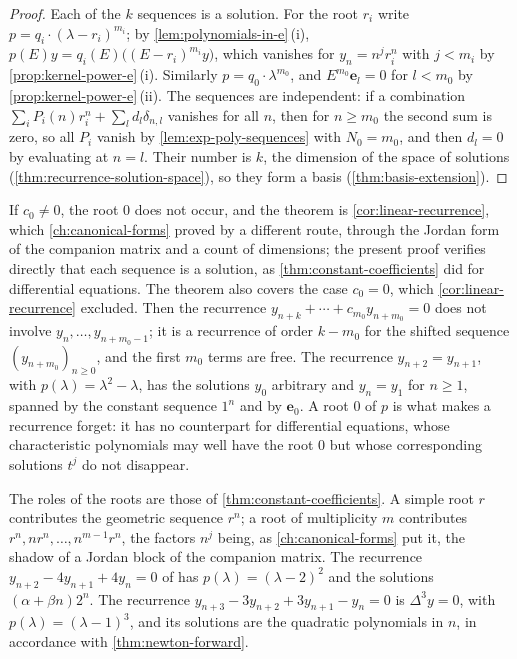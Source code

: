 \begin{proof}
Each of the $k$ sequences is a solution. For the root $r_i$ write $p=q_i\cdot(\lambda-r_i)^{m_i}$; by \cref{lem:polynomials-in-e}\,(i), $p(E)y=q_i(E)\bigl((E-r_i)^{m_i}y\bigr)$, which vanishes for $y_n=n^jr_i^n$ with $j<m_i$ by \cref{prop:kernel-power-e}\,(i). Similarly $p=q_0\cdot\lambda^{m_0}$, and $E^{m_0}\mathbf e_l=0$ for $l<m_0$ by \cref{prop:kernel-power-e}\,(ii). The sequences are independent: if a combination $\sum_iP_i(n)r_i^n+\sum_ld_l\delta_{n,l}$ vanishes for all $n$, then for $n\ge m_0$ the second sum is zero, so all $P_i$ vanish by \cref{lem:exp-poly-sequences} with $N_0=m_0$, and then $d_l=0$ by evaluating at $n=l$. Their number is $k$, the dimension of the space of solutions (\cref{thm:recurrence-solution-space}), so they form a basis (\cref{thm:basis-extension}).
\end{proof}

If $c_0\ne0$, the root $0$ does not occur, and the theorem is \cref{cor:linear-recurrence}, which \cref{ch:canonical-forms} proved by a different route, through the Jordan form of the companion matrix and a count of dimensions; the present proof verifies directly that each sequence is a solution, as \cref{thm:constant-coefficients} did for differential equations. The theorem also covers the case $c_0=0$, which \cref{cor:linear-recurrence} excluded. Then the recurrence $y_{n+k}+\cdots+c_{m_0}y_{n+m_0}=0$ does not involve $y_n,\ldots,y_{n+m_0-1}$; it is a recurrence of order $k-m_0$ for the shifted sequence $(y_{n+m_0})_{n\ge0}$, and the first $m_0$ terms are free. The recurrence $y_{n+2}=y_{n+1}$, with $p(\lambda)=\lambda^2-\lambda$, has the solutions $y_0$ arbitrary and $y_n=y_1$ for $n\ge1$, spanned by the constant sequence $1^n$ and by $\mathbf e_0$. A root $0$ of $p$ is what makes a recurrence forget: it has no counterpart for differential equations, whose characteristic polynomials may well have the root $0$ but whose corresponding solutions $t^j$ do not disappear.

The roles of the roots are those of \cref{thm:constant-coefficients}. A simple root $r$ contributes the geometric sequence $r^n$; a root of multiplicity $m$ contributes $r^n,nr^n,\ldots,n^{m-1}r^n$, the factors $n^j$ being, as \cref{ch:canonical-forms} put it, the shadow of a Jordan block of the companion matrix. The recurrence $y_{n+2}-4y_{n+1}+4y_n=0$ of  has $p(\lambda)=(\lambda-2)^2$ and the solutions $(\alpha+\beta n)2^n$. The recurrence $y_{n+3}-3y_{n+2}+3y_{n+1}-y_n=0$ is $\Delta^3y=0$, with $p(\lambda)=(\lambda-1)^3$, and its solutions are the quadratic polynomials in $n$, in accordance with \cref{thm:newton-forward}.

